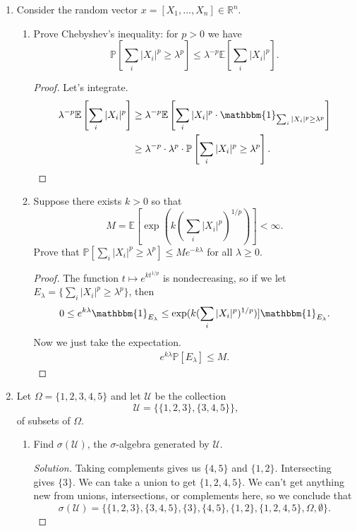 \documentclass[11pt,letterpaper]{report}
\newcommand{\reals}{\mathbb{R}}
\newcommand{\mcal}[1]{\mathcal{#1}}
\newcommand{\E}{\mathbb{E}}
\newcommand{\prob}{\mathbb{P}}{}
\newcommand{\cov}{\text{cov}}
\newcommand{\ind}{\mathbbm{1}}
\newenvironment{solution}
{\begin{proof}[Solution]}
{\end{proof}}
\begin{document}
\begin{enumerate}
\begin{enumerate}
\begin{solution}
			\noindent Let's compute the covariance function.
			\begin{align*}
				\text{cov}(s,t) &= \cov(e^{-as}B_{e^{2as}}, e^{-at}B_{e^{2at}})\\
				&= e^{-a(s+t)}\E[B_{e^{2as}}B_{e^{2at}}]\\
				&= e^{-a(s+t)}(e^{2as}\land e^{2at}).
			\end{align*}
		\end{solution}
	\end{enumerate}
	\item Consider the random vector $x = [X_1, \ldots, X_n]\in \reals^n$.
	\begin{enumerate}
		\item Prove Chebyshev's inequality: for $p>0$ we have
		\[
		\prob\left[\sum_i|X_i|^p\geq \lambda^p\right]\leq \lambda^{-p}\E\left[\sum_i|X_i|^p\right].
		\]
		\begin{proof}
			Let's integrate.
			\begin{align*}
				\lambda^{-p}\E\left[\sum_i|X_i|^p\right]&\geq \lambda^{-p}\E\left[\sum_i|X_i|^p\cdot \ind_{\sum_i|X_i|^p \geq \lambda^p} \right]\\
				&\geq \lambda^{-p}\cdot \lambda^p\cdot \prob\left[\sum_i|X_i|^p\geq \lambda^p\right].
			\end{align*}
		\end{proof}

		\item Suppose there exists $k>0$ so that
		\[
		M = \E[\exp(k(\sum_i|X_i|^p)^{1/p})]<\infty.
		\]
		Prove that $\prob[\sum_i|X_i|^p\geq \lambda^p]\leq Me^{-k\lambda}$ for all $\lambda\geq 0$.
		\begin{proof}
			The function $t\mapsto e^{kt^{1/p}}$ is nondecreasing, so if we let $E_\lambda = \{\sum_i|X_i|^p\geq \lambda^p\}$, then
			\begin{align*}
				0\leq e^{k\lambda}\ind_{E_\lambda}\leq \exp(k(\sum_i|X_i|^p)^{1/p})]\ind_{E_\lambda}.
			\end{align*}
			Now we just take the expectation.
			\begin{align*}
				e^{k\lambda}\prob[E_\lambda]\leq M.
			\end{align*}
		\end{proof}
	\end{enumerate}

	\item Let $\Omega = \{1, 2, 3, 4, 5\}$ and let $\mcal{U}$ be the collection
	\[
	\mcal{U} = \{\{1, 2, 3\}, \{3, 4, 5\}\},
	\]
	of subsets of $\Omega$.
	\begin{enumerate}
		\item Find $\sigma(\mcal{U})$, the $\sigma$-algebra generated by $\mcal{U}$.
		\begin{solution}
			Taking complements gives us $\{4, 5\}$ and $\{1, 2\}$. Intersecting gives $\{3\}$. We can take a union to get $\{1, 2, 4, 5\}$. We can't get anything new from unions, intersections, or complements here, so we conclude that
			\[
			\sigma(\mcal{U}) = \{\{1, 2, 3\}, \{3, 4, 5\}, \{3\}, \{4, 5\}, \{1, 2\}, \{1, 2, 4, 5\}, \Omega, \emptyset\}.
			\]
		\end{solution}


\end{enumerate}
\end{enumerate}
\end{document}
